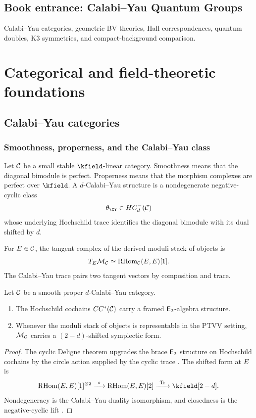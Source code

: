 \cleardoublepage
{}
{}
\chapter*{Book entrance: Calabi--Yau Quantum Groups}
\begin{summarybox}
Calabi--Yau categories, geometric BV theories, Hall correspondences, quantum doubles, K3 symmetries, and compact-background comparison.
\end{summarybox}
\part{Categorical and field-theoretic foundations}

\chapter{Calabi--Yau categories}
\section{Smoothness, properness, and the Calabi--Yau class}
Let $\mathcal C$ be a small stable $\kfield$-linear category. Smoothness means that the diagonal bimodule is perfect. Properness means that the morphism complexes are perfect over $\kfield$. A $d$-Calabi--Yau structure is a nondegenerate negative-cyclic class
\[
 \theta_{\CY}\in HC^-_d(\Ccal)
\]
whose underlying Hochschild trace identifies the diagonal bimodule with its dual shifted by $d$.

For $E\in\mathcal C$, the tangent complex of the derived moduli stack of objects is
\[
 T_E\mathcal M_{\mathcal C}\simeq\operatorname{RHom}_{\mathcal C}(E,E)[1].
\]
The Calabi--Yau trace pairs two tangent vectors by composition and trace.

\begin{theorem}
Let $\mathcal C$ be a smooth proper $d$-Calabi--Yau category.
\begin{enumerate}
\item The Hochschild cochains $CC^*(\mathcal C)$ carry a framed $\mathsf E_2$-algebra structure.
\item Whenever the moduli stack of objects is representable in the PTVV setting, $\mathcal M_{\mathcal C}$ carries a $(2-d)$-shifted symplectic form.
\end{enumerate}
\end{theorem}
\begin{proof}
The cyclic Deligne theorem upgrades the brace $\mathsf E_2$ structure on Hochschild cochains by the circle action supplied by the cyclic trace \cite{BravRozenblyum}. The shifted form at $E$ is
\[
 \RHom(E,E)[1]^{\tensor2}
 \xrightarrow{\ \circ\ }
 \RHom(E,E)[2]
 \xrightarrow{\ \Tr\ }
 \kfield[2-d].
\]
Nondegeneracy is the Calabi--Yau duality isomorphism, and closedness is the negative-cyclic lift \cite{PTVV,BravDyckerhoff}.
\end{proof}

